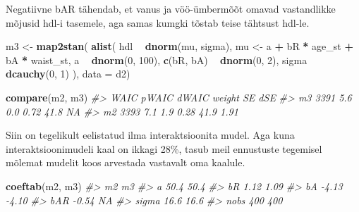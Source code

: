\documentclass[]{book}
\newenvironment{Shaded}{\begin{snugshade}}{\end{snugshade}}
\newcommand{\KeywordTok}[1]{\textcolor[rgb]{0.13,0.29,0.53}{\textbf{#1}}}
\newcommand{\DataTypeTok}[1]{\textcolor[rgb]{0.13,0.29,0.53}{#1}}
\newcommand{\DecValTok}[1]{\textcolor[rgb]{0.00,0.00,0.81}{#1}}
\newcommand{\StringTok}[1]{\textcolor[rgb]{0.31,0.60,0.02}{#1}}
\newcommand{\CommentTok}[1]{\textcolor[rgb]{0.56,0.35,0.01}{\textit{#1}}}
\newcommand{\OperatorTok}[1]{\textcolor[rgb]{0.81,0.36,0.00}{\textbf{#1}}}
\newcommand{\NormalTok}[1]{#1}
\begin{document}
Negatiivne bAR tähendab, et vanus ja vöö-ümbermõõt omavad vastandlikke
mõjusid hdl-i tasemele, aga samas kumgki tõstab teise tähtsust hdl-le.

\begin{Shaded}
\begin{Highlighting}[]
\NormalTok{m3 <-}\StringTok{ }\KeywordTok{map2stan}\NormalTok{(}
    \KeywordTok{alist}\NormalTok{(}
\NormalTok{        hdl }\OperatorTok{~}\StringTok{ }\KeywordTok{dnorm}\NormalTok{(mu, sigma),}
\NormalTok{        mu <-}\StringTok{ }\NormalTok{a }\OperatorTok{+}\StringTok{ }\NormalTok{bR }\OperatorTok{*}\StringTok{ }\NormalTok{age_st }\OperatorTok{+}\StringTok{ }\NormalTok{bA }\OperatorTok{*}\StringTok{ }\NormalTok{waist_st,}
\NormalTok{        a }\OperatorTok{~}\StringTok{ }\KeywordTok{dnorm}\NormalTok{(}\DecValTok{0}\NormalTok{, }\DecValTok{100}\NormalTok{),}
        \KeywordTok{c}\NormalTok{(bR, bA) }\OperatorTok{~}\StringTok{ }\KeywordTok{dnorm}\NormalTok{(}\DecValTok{0}\NormalTok{, }\DecValTok{2}\NormalTok{),}
\NormalTok{        sigma }\OperatorTok{~}\StringTok{ }\KeywordTok{dcauchy}\NormalTok{(}\DecValTok{0}\NormalTok{, }\DecValTok{1}\NormalTok{)}
\NormalTok{), }\DataTypeTok{data =}\NormalTok{ d2)}
\end{Highlighting}
\end{Shaded}

\begin{Shaded}
\begin{Highlighting}[]
\KeywordTok{compare}\NormalTok{(m2, m3)}
\CommentTok{#>    WAIC pWAIC dWAIC weight   SE  dSE}
\CommentTok{#> m3 3391   5.6   0.0   0.72 41.8   NA}
\CommentTok{#> m2 3393   7.1   1.9   0.28 41.9 1.91}
\end{Highlighting}
\end{Shaded}

Siin on tegelikult eelistatud ilma interaktsioonita mudel. Aga kuna
interaktsioonimudeli kaal on ikkagi 28\%, tasub meil ennustuste
tegemisel mõlemat mudelit koos arvestada vastavalt oma kaalule.

\begin{Shaded}
\begin{Highlighting}[]
\KeywordTok{coeftab}\NormalTok{(m2, m3)}
\CommentTok{#>       m2      m3     }
\CommentTok{#> a        50.4    50.4}
\CommentTok{#> bR       1.12    1.09}
\CommentTok{#> bA      -4.13   -4.10}
\CommentTok{#> bAR     -0.54      NA}
\CommentTok{#> sigma    16.6    16.6}
\CommentTok{#> nobs      400     400}
\end{Highlighting}
\end{Shaded}
\end{document}
